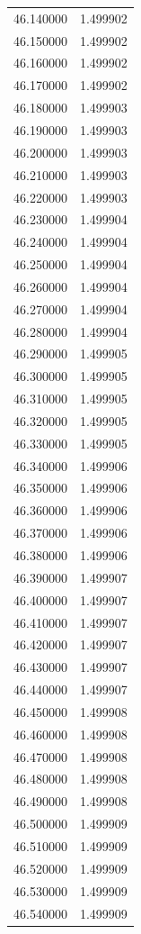 \begin{tabular}{rr}
46.140000 & 1.499902 \\
46.150000 & 1.499902 \\
46.160000 & 1.499902 \\
46.170000 & 1.499902 \\
46.180000 & 1.499903 \\
46.190000 & 1.499903 \\
46.200000 & 1.499903 \\
46.210000 & 1.499903 \\
46.220000 & 1.499903 \\
46.230000 & 1.499904 \\
46.240000 & 1.499904 \\
46.250000 & 1.499904 \\
46.260000 & 1.499904 \\
46.270000 & 1.499904 \\
46.280000 & 1.499904 \\
46.290000 & 1.499905 \\
46.300000 & 1.499905 \\
46.310000 & 1.499905 \\
46.320000 & 1.499905 \\
46.330000 & 1.499905 \\
46.340000 & 1.499906 \\
46.350000 & 1.499906 \\
46.360000 & 1.499906 \\
46.370000 & 1.499906 \\
46.380000 & 1.499906 \\
46.390000 & 1.499907 \\
46.400000 & 1.499907 \\
46.410000 & 1.499907 \\
46.420000 & 1.499907 \\
46.430000 & 1.499907 \\
46.440000 & 1.499907 \\
46.450000 & 1.499908 \\
46.460000 & 1.499908 \\
46.470000 & 1.499908 \\
46.480000 & 1.499908 \\
46.490000 & 1.499908 \\
46.500000 & 1.499909 \\
46.510000 & 1.499909 \\
46.520000 & 1.499909 \\
46.530000 & 1.499909 \\
46.540000 & 1.499909 \\

\end{tabular}
